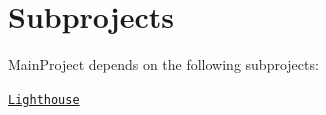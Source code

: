 \chapter{Subprojects }
\hypertarget{subprojects}{}\label{subprojects}
Main\+Project depends on the following subprojects:\+
\begin{DoxyItemize}
\item \href{../../../LighthouseESP/Doxygen_Lighthouse/output/html/index.html}{\texttt{Lighthouse}} 
\end{DoxyItemize}